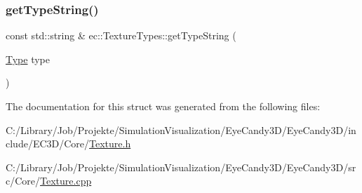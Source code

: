 \subsubsection{\texorpdfstring{get\+Type\+String()}{getTypeString()}}
{\footnotesize\ttfamily const std\+::string \& ec\+::\+Texture\+Types\+::get\+Type\+String (\begin{DoxyParamCaption}\item[{\mbox{\hyperlink{structec_1_1_texture_types_aff67825b98dd1edd7e4783350e866202}{Type}}}]{type }\end{DoxyParamCaption})\hspace{0.3cm}{\ttfamily [static]}}



The documentation for this struct was generated from the following files\+:\begin{DoxyCompactItemize}
\item 
C\+:/\+Library/\+Job/\+Projekte/\+Simulation\+Visualization/\+Eye\+Candy3\+D/\+Eye\+Candy3\+D/include/\+E\+C3\+D/\+Core/\mbox{\hyperlink{_texture_8h}{Texture.\+h}}\item 
C\+:/\+Library/\+Job/\+Projekte/\+Simulation\+Visualization/\+Eye\+Candy3\+D/\+Eye\+Candy3\+D/src/\+Core/\mbox{\hyperlink{_texture_8cpp}{Texture.\+cpp}}\end{DoxyCompactItemize}
